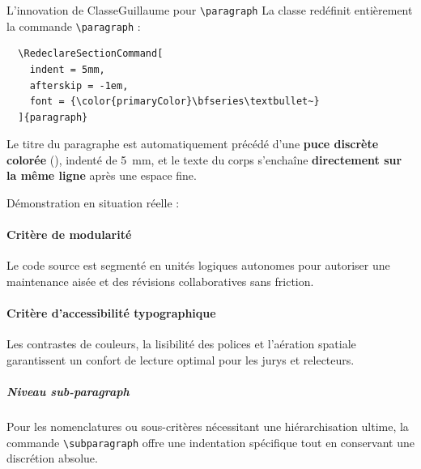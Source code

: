\begin{boiteSynthese}{L'innovation de ClasseGuillaume pour \texttt{\textbackslash paragraph}}
  La classe redéfinit entièrement la commande \texttt{\textbackslash paragraph} :
  \begin{verbatim}
  \RedeclareSectionCommand[
    indent = 5mm,
    afterskip = -1em,
    font = {\color{primaryColor}\bfseries\textbullet~}
  ]{paragraph}
  \end{verbatim}
  Le titre du paragraphe est automatiquement précédé d'une \textbf{puce discrète colorée} (\texttt{\textbullet}), indenté de \qty{5}{\milli\meter}, et le texte du corps s'enchaîne \textbf{directement sur la même ligne} après une espace fine.
\end{boiteSynthese}

Démonstration en situation réelle :

\paragraph{Critère de modularité}
Le code source est segmenté en unités logiques autonomes pour autoriser une maintenance aisée et des révisions collaboratives sans friction.

\paragraph{Critère d'accessibilité typographique}
Les contrastes de couleurs, la lisibilité des polices et l'aération spatiale garantissent un confort de lecture optimal pour les jurys et relecteurs.

\subparagraph{Niveau sub-paragraph}
Pour les nomenclatures ou sous-critères nécessitant une hiérarchisation ultime, la commande \texttt{\textbackslash subparagraph} offre une indentation spécifique tout en conservant une discrétion absolue.

